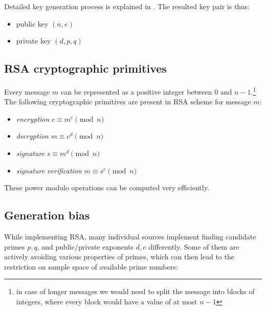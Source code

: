 Detailed key generation process is explained in \cite{thesis_matus_nemec}. The resulted key pair is thus:

\begin{itemize}

\item public key $(n, e)$

\item private key $(d, p, q)$

\end{itemize}

\subsection*{RSA cryptographic primitives}

Every message $m$ can be represented as a positive integer between 0 and $n-1$.\footnote{in case of longer messages we would need to split the message into blocks of integers, where every block would have a value of at most $n-1$} The following cryptographic primitives are present in RSA scheme for message $m$:

\begin{itemize}

\item \textit{encryption} $c \equiv m^e \pmod{n}$
\item \textit{decryption} $m \equiv c^d \pmod{n}$
\item \textit{signature} $s \equiv m^d \pmod{n}$
\item \textit{signature verification} $m \equiv s^e \pmod{n}$

\end{itemize}

\noindent
These power modulo operations can be computed very efficiently.

\subsection{Generation bias}

While implementing RSA, many individual sources implement finding candidate primes $p,q$, and public/private exponents $d,e$ differently. Some of them are actively avoiding various properties of primes, which can then lead to the restriction on sample space of available prime numbers:

